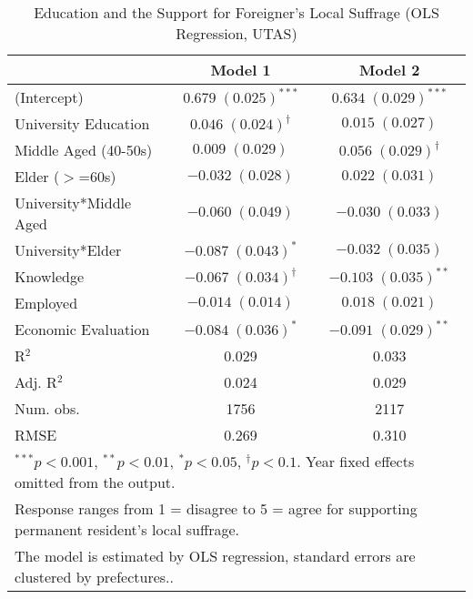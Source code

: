 
\begin{table}
\caption{Education and the Support for Foreigner's Local Suffrage (OLS Regression, UTAS)}
\begin{center}
\begin{tabular}{l c c }
\toprule
 & Model 1 & Model 2 \\
\midrule
(Intercept)            & $0.679 \; (0.025)^{***}$      & $0.634 \; (0.029)^{***}$     \\
University Education   & $0.046 \; (0.024)^{\dagger}$  & $0.015 \; (0.027)$           \\
Middle Aged (40-50s)   & $0.009 \; (0.029)$            & $0.056 \; (0.029)^{\dagger}$ \\
Elder ($>$=60s)        & $-0.032 \; (0.028)$           & $0.022 \; (0.031)$           \\
University*Middle Aged & $-0.060 \; (0.049)$           & $-0.030 \; (0.033)$          \\
University*Elder       & $-0.087 \; (0.043)^{*}$       & $-0.032 \; (0.035)$          \\
Knowledge              & $-0.067 \; (0.034)^{\dagger}$ & $-0.103 \; (0.035)^{**}$     \\
Employed               & $-0.014 \; (0.014)$           & $0.018 \; (0.021)$           \\
Economic Evaluation    & $-0.084 \; (0.036)^{*}$       & $-0.091 \; (0.029)^{**}$     \\
\midrule
R$^2$                  & 0.029                         & 0.033                        \\
Adj. R$^2$             & 0.024                         & 0.029                        \\
Num. obs.              & 1756                          & 2117                         \\
RMSE                   & 0.269                         & 0.310                        \\
\bottomrule
\multicolumn{3}{l}{\scriptsize{$^{***}p<0.001$, $^{**}p<0.01$, $^*p<0.05$, $^{\dagger}p<0.1$. Year fixed effects omitted from the output.}} \\ \multicolumn{3}{l}{\scriptsize{Response ranges from 1 = disagree to 5 = agree for supporting permanent resident's local suffrage.}} \\ \multicolumn{3}{l}{\scriptsize{The model is estimated by OLS regression, standard errors are clustered by prefectures..}}
\end{tabular}
\label{lmtab_umo}
\end{center}
\end{table}

